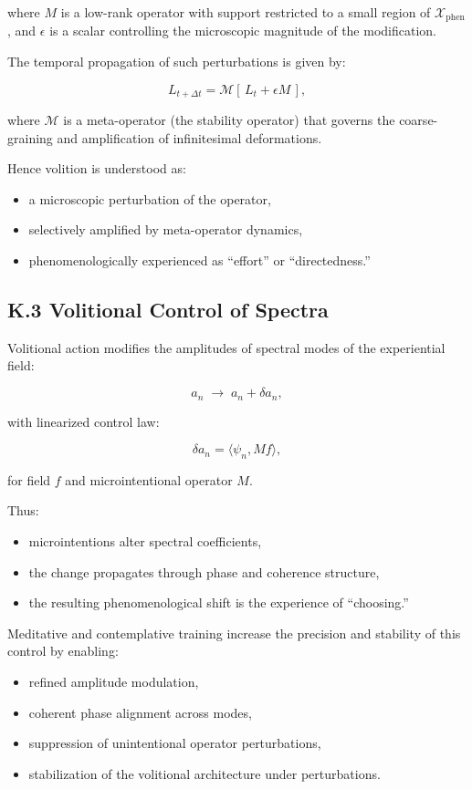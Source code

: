 \documentclass[12pt]{article}
\begin{document}
where $M$ is a low-rank operator with support restricted to a small region of
$\mathcal{X}_{\text{phen}}$, and $\epsilon$ is a scalar controlling the
microscopic magnitude of the modification.

The temporal propagation of such perturbations is given by:

\[
L_{t+\Delta t}
=
\mathcal{M}\!\left[\,L_t + \epsilon M\,\right],
\]

where $\mathcal{M}$ is a meta-operator (the stability operator) that governs the
coarse-graining and amplification of infinitesimal deformations.

Hence volition is understood as:

\begin{itemize}
\item a microscopic perturbation of the operator,
\item selectively amplified by meta-operator dynamics,
\item phenomenologically experienced as “effort” or “directedness.”
\end{itemize}

\subsection*{K.3 Volitional Control of Spectra}

Volitional action modifies the amplitudes of spectral modes of the experiential
field:

\[
a_n \;\to\; a_n + \delta a_n,
\]

with linearized control law:

\[
\delta a_n
=
\langle \psi_n, M f \rangle,
\]

for field $f$ and microintentional operator $M$.

Thus:

\begin{itemize}
\item microintentions alter spectral coefficients,
\item the change propagates through phase and coherence structure,
\item the resulting phenomenological shift is the experience of ``choosing.''
\end{itemize}

Meditative and contemplative training increase the precision and stability of
this control by enabling:

\begin{itemize}
\item refined amplitude modulation,
\item coherent phase alignment across modes,
\item suppression of unintentional operator perturbations,
\item stabilization of the volitional architecture under perturbations.
\end{itemize}
\end{document}
